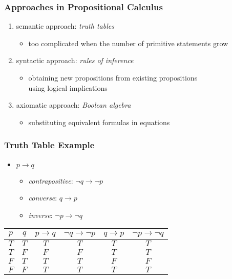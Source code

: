 \documentclass[dvipsnames]{beamer}
\begin{document}
\begin{frame}
  \frametitle{Approaches in Propositional Calculus}

  \begin{enumerate}
    \item semantic approach: \emph{truth tables}
    \begin{itemize}
      \item too complicated when the number of primitive statements grow
    \end{itemize}

    \pause
    \item syntactic approach: \emph{rules of inference}
    \begin{itemize}
      \item obtaining new propositions from existing propositions\\
        using logical implications
    \end{itemize}

    \pause
    \item axiomatic approach: \emph{Boolean algebra}
    \begin{itemize}
      \item substituting equivalent formulas in equations
    \end{itemize}
  \end{enumerate}
\end{frame}

\begin{frame}
  \frametitle{Truth Table Example}

  \begin{itemize}
    \item $p \rightarrow q$
    \begin{itemize}
      \item \emph{contrapositive}: $\neg q \rightarrow \neg p$
      \item \emph{converse}: $q \rightarrow p$
      \item \emph{inverse}: $\neg p \rightarrow \neg q$
    \end{itemize}
  \end{itemize}

  \pause
  \begin{example}
    \begin{center}
      \begin{tabular}{|c|c||c||c||c||c|}\hline
        $p$ & $q$ & $p \rightarrow q$ & $\neg q \rightarrow \neg p$
            & $q \rightarrow p$ & $\neg p \rightarrow \neg q$\\\hline\hline
        $T$ & $T$ & $T$ & $T$ & $T$ & $T$\\\hline
        $T$ & $F$ & $F$ & $F$ & $T$ & $T$\\\hline
        $F$ & $T$ & $T$ & $T$ & $F$ & $F$\\\hline
        $F$ & $F$ & $T$ & $T$ & $T$ & $T$\\\hline
      \end{tabular}
    \end{center}
  \end{example}
\end{frame}
\end{document}
